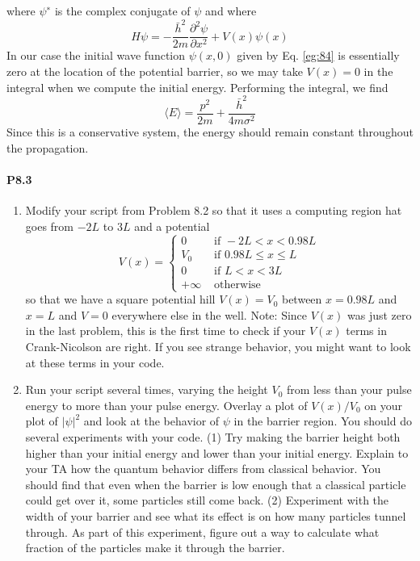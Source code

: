 \documentclass{book}
\theoremstyle{plain}
\theoremstyle{definition}
\numberwithin{exm}{chapter}
\theoremstyle{remark}
\theoremstyle{summary}
\theoremstyle{overview}
\begin{document}
where $\psi^∗$ is the complex conjugate of $\psi$ and where
\begin{equation}\label{eq:87}
H \psi=-\frac{\bar{h}^{2}}{2 m} \frac{\partial^{2} \psi}{\partial x^{2}}+V(x) \psi(x)
\end{equation}
In our case the initial wave function $\psi(x,0)$ given by Eq. \eqref{eg:84} is essentially zero at
the location of the potential barrier, so we may take $V(x) = 0$ in the integral when
we compute the initial energy. Performing the integral, we find
\begin{equation}\label{eq:88}
\langle E\rangle=\frac{p^{2}}{2 m}+\frac{\bar{h}^{2}}{4 m \sigma^{2}}
\end{equation}
Since this is a conservative system, the energy should remain constant throughout
the propagation.
\paragraph*{P8.3}
\begin{enumerate}[label=(\alph*)]
	\item Modify your script from Problem 8.2 so that it uses a computing region hat goes from $-2L$ to $3L$ and a potential
\begin{equation}\label{eq:89}
V(x)= \begin{cases}0 & \text { if }-2 L<x<0.98 L \\ V_{0} & \text { if } 0.98 L \leq x \leq L \\ 0 & \text { if } L<x<3 L \\ +\infty & \text { otherwise }\end{cases}
\end{equation}
so that we have a square potential hill $V(x) = V_0$ between $x = 0.98L$ and $x = L$ and $V = 0$ everywhere else in the well.
Note: Since $V(x)$ was just zero in the last problem, this is the first time
to check if your $V(x)$ terms in Crank-Nicolson are right. If you see
strange behavior, you might want to look at these terms in your code.
\item Run your script several times, varying the height $V_0$ from less than your pulse energy to more than your pulse energy. Overlay a plot
of $V(x)/V_0$ on your plot of $ \vert \psi\vert^2$ and look at the behavior of $\psi$ in the barrier region. You should do several experiments with your code. (1) Try making
the barrier height both higher than your initial energy and lower than
your initial energy. Explain to your TA how the quantum behavior
differs from classical behavior. You should find that even when the
barrier is low enough that a classical particle could get over it, some
particles still come back. (2) Experiment with the width of your barrier
and see what its effect is on how many particles tunnel through. As
part of this experiment, figure out a way to calculate what fraction of
the particles make it through the barrier.

\end{enumerate}
\end{document}
